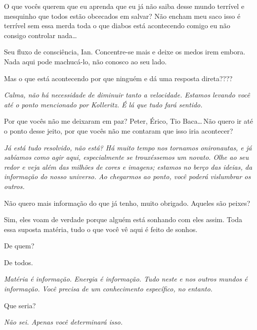 O que vocês querem que eu aprenda que eu já não saiba desse mundo
terrível e mesquinho que todos estão obcecados em salvar? Não encham meu
saco isso é terrível sem essa merda toda o que diabos está acontecendo
comigo eu não consigo controlar nada\ldots

Seu fluxo de consciência, Ian. Concentre-se mais e deixe os medos irem
embora. Nada aqui pode machucá-lo, não conosco ao seu lado.

\espaco

Mas o que está acontecendo por que ninguém e dá
u\hspace{1ex}m\hspace{1ex}a res\hspace{2ex}pos\hspace{2ex}ta
dire\vspace{3ex}ta????

\emph{Calma, não há necessidade de diminuir tanto a velocidade. Estamos
levando você até o ponto mencionado por Kolleritz. É lá que tudo fará
sentido.}

\espaco

Por que vocês não me deixaram em paz? Peter, Érico, Tio Baca\ldots\,Não
quero ir até o ponto desse jeito, por que vocês não me contaram que isso
iria acontecer?

\emph{Já está tudo resolvido, não está? Há muito tempo nos tornamos
onironautas, e já sabíamos como agir aqui, especialmente se trouxéssemos
um novato. Olhe ao seu redor e veja além das milhões de cores e imagens;
estamos no berço das ideias, da informação do nosso universo. Ao
chegarmos ao ponto, você poderá vislumbrar os outros.}

Não quero mais informação do que já tenho, muito obrigado. Aqueles são
peixes?

Sim, eles voam de verdade porque alguém está sonhando com eles assim.
Toda essa suposta matéria, tudo o que você vê aqui é feito de sonhos.

\espaco

De quem?

De todos.

\emph{Matéria é informação. Energia é informação. Tudo neste e nos
outros mundos é informação. Você precisa de um conhecimento específico,
no entanto.}

\espaco

Que seria?

\espaco

\emph{Não sei. Apenas você determinará isso.}

\espaco

